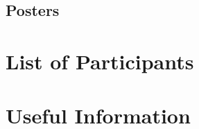 \documentclass[openany, parskip=full, 12pt, a4]{scrbook}
\begin{document}
\vspace{-2.5em}

\section{Posters}


















\chapter{List of Participants}
 

 
\chapter{Useful Information}





\pagecolor{myblue}
\thispagestyle{empty}
\mbox{}
\end{document}
